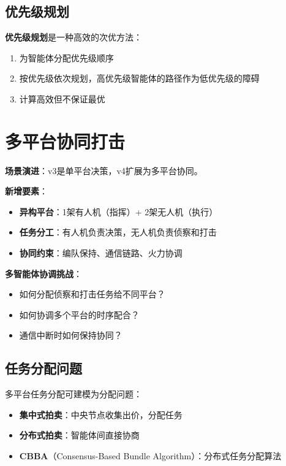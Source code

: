 \subsection{优先级规划}

\textbf{优先级规划}是一种高效的次优方法：
\begin{enumerate}[leftmargin=2em]
  \item 为智能体分配优先级顺序
  \item 按优先级依次规划，高优先级智能体的路径作为低优先级的障碍
  \item 计算高效但不保证最优
\end{enumerate}

\section{多平台协同打击}

\begin{caseboxB}
\textbf{场景演进}：v3是单平台决策，v4扩展为多平台协同。

\textbf{新增要素}：
\begin{itemize}
  \item \textbf{异构平台}：1架有人机（指挥）+ 2架无人机（执行）
  \item \textbf{任务分工}：有人机负责决策，无人机负责侦察和打击
  \item \textbf{协同约束}：编队保持、通信链路、火力协调
\end{itemize}

\textbf{多智能体协调挑战}：
\begin{itemize}
  \item 如何分配侦察和打击任务给不同平台？
  \item 如何协调多个平台的时序配合？
  \item 通信中断时如何保持协同？
\end{itemize}
\end{caseboxB}

\subsection{任务分配问题}

多平台任务分配可建模为分配问题：

\begin{itemize}[leftmargin=2em]
  \item \textbf{集中式拍卖}：中央节点收集出价，分配任务
  \item \textbf{分布式拍卖}：智能体间直接协商
  \item \textbf{CBBA}（Consensus-Based Bundle Algorithm）：分布式任务分配算法
\end{itemize}

